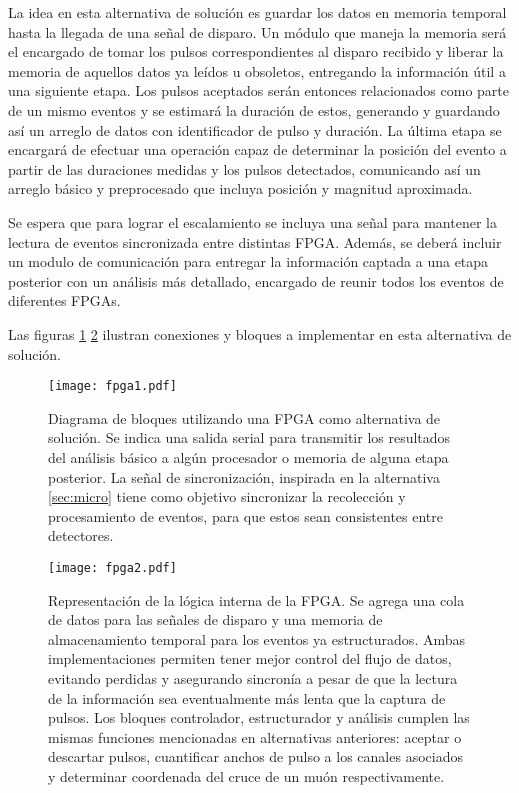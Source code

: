 	La idea en esta alternativa de solución es guardar los datos en memoria temporal hasta la llegada de una señal de disparo. Un módulo que maneja la memoria será el encargado de tomar los pulsos correspondientes al disparo recibido y liberar la memoria de aquellos datos ya leídos u obsoletos, entregando la información útil a una siguiente etapa. Los pulsos aceptados serán entonces relacionados como parte de un mismo eventos y se estimará la duración de estos, generando y guardando así un arreglo de datos con identificador de pulso y duración. La última etapa se encargará de efectuar una operación capaz de determinar la posición del evento a partir de las duraciones medidas y los pulsos detectados, comunicando así un arreglo básico y preprocesado que incluya posición y magnitud aproximada.
	
	\par Se espera que para lograr el escalamiento se incluya una señal para mantener la lectura de eventos sincronizada entre distintas FPGA. Además, se deberá incluir un modulo de comunicación para entregar la información captada a una etapa posterior con un análisis más detallado, encargado de reunir todos los eventos de diferentes FPGAs.
	
	\newpage
	\par Las figuras \ref{img:fpga1} \ref{img:fpga2} ilustran conexiones y bloques a implementar en esta alternativa de solución.
	
	\begin{figure}[H]
		\centering
		\texttt{[image: fpga1.pdf]}
		\caption{Diagrama de bloques utilizando una FPGA como alternativa de solución. Se indica una salida serial para transmitir los resultados del análisis básico a algún procesador o memoria de alguna etapa posterior. La señal de sincronización, inspirada en la alternativa \ref{sec:micro} tiene como objetivo sincronizar la recolección y procesamiento de eventos, para que estos sean consistentes entre detectores.}
		\label{img:fpga1}
	\end{figure}
	
	\begin{figure}[H]
		\centering
		\texttt{[image: fpga2.pdf]}
		\caption{Representación de la lógica interna de la FPGA. Se agrega una cola de datos para las señales de disparo y una memoria de almacenamiento temporal para los eventos ya estructurados. Ambas implementaciones permiten tener mejor control del flujo de datos, evitando perdidas y asegurando sincronía a pesar de que la lectura de la información sea eventualmente más lenta que la captura de pulsos. Los bloques controlador, estructurador y análisis cumplen las mismas funciones mencionadas en alternativas anteriores: aceptar o descartar pulsos, cuantificar anchos de pulso a  los canales asociados y determinar coordenada del cruce de un muón respectivamente.}
		\label{img:fpga2}
	\end{figure}
	
